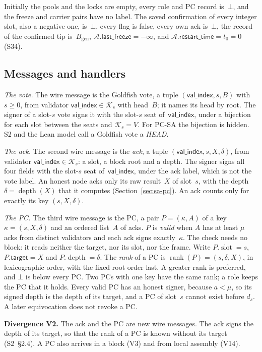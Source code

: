 \documentclass{article}
\newcommand{\genesis}{B_{\mathrm{gen}}}
\newcommand{\slot}{\operatorname{slot}}
\newcommand{\valindex}{\mathsf{val\_index}}
\newcommand{\committee}{\mathcal K}
\newcommand{\AC}{\mathcal A}
\newcommand{\restartTime}{\mathsf{restart\_time}}
\newcommand{\rank}{\operatorname{rank}}
\newcommand{\depth}{\operatorname{depth}}
\newcommand{\PCdiv}[2]{\par\noindent\textbf{Divergence #1.} #2\par}
\begin{document}
Initially the pools and the locks are empty, every role and PC record
is~$\bot$, and the freeze and carrier pairs have no label.  The saved
confirmation of every integer slot, also a negative one, is~$\bot$, every
flag is false, every own ack is~$\bot$, the record of the confirmed tip
is~$\genesis$, $\AC.\mathsf{last\_freeze}=-\infty$, and $\AC.\restartTime=t_0=0$
(S34).

\subsection{Messages and handlers}\label{sec:sa-handlers}

\emph{The vote.}  The wire message is the Goldfish vote, a tuple
$(\valindex,s,B)$ with $s\geq0$, from validator $\valindex\in\committee_s$
with head~$B$; it names its head by root.  The signer of a slot-$s$ vote
signs it with the slot-$s$ seat of~$\valindex$, under a bijection for each
slot between the seats and $\committee_s=V$.  For PC-SA the bijection is
hidden.  S2 and the Lean model call a Goldfish vote a \emph{HEAD}.

\emph{The ack.}  The second wire message is the \emph{ack}, a tuple
$(\valindex,s,X,\delta)$, from validator $\valindex\in\committee_s$: a
slot, a block root and a depth.  The signer signs all four fields with the
slot-$s$ seat of~$\valindex$, under the ack label, which is not the vote
label.  An honest node acks only its raw result~$X$ of slot~$s$, with the
depth $\delta=\depth(X)$ that it computes (Section~\ref{sec:sa-pc}).  An ack
counts only for exactly its key $(s,X,\delta)$.

\emph{The PC.}  The third wire message is the PC, a pair $P=(\kappa,A)$ of
a key $\kappa=(s,X,\delta)$ and an ordered list~$A$ of acks.  $P$ is
\emph{valid} when $A$ has at least $\mu$ acks from distinct validators and
each ack signs exactly~$\kappa$.  The check needs no block: it reads
neither the target, nor its slot, nor the frame.  Write $P.\slot=s$,
$P.\mathsf{target}=X$ and $P.\depth=\delta$.  The \emph{rank} of a PC is
$\rank(P)=(s,\delta,X)$, in lexicographic order, with the fixed root order
last.  A greater rank is preferred, and $\bot$ is below every PC.  Two PCs
with one key have the same rank; a role keeps the PC that it holds.  Every
valid PC has an honest signer, because $a<\mu$, so its signed depth is the
depth of its target, and a PC of slot~$s$ cannot exist before $d_s$.  A
later equivocation does not revoke a PC.

\PCdiv{V2}{The ack and the PC are new wire messages.  The ack signs the
depth of its target, so that the rank of a PC is known without its target
(S2~\S2.4).  A PC also arrives in a block (V3) and from local assembly
(V14).}
\end{document}
